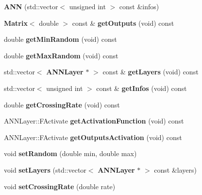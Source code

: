\begin{DoxyCompactItemize}
\item 
{\bfseries A\+N\+N} (std\+::vector$<$ unsigned int $>$ const \&infos)\label{class_g_a_n_n_1_1_a_n_n_a8b7b98feba4aea412db698035cdcb418}

\item 
{\bf Matrix}$<$ double $>$ const \& {\bfseries get\+Outputs} (void) const \label{class_g_a_n_n_1_1_a_n_n_a0c24550b535019fc04027da71f3e8ebf}

\item 
double {\bfseries get\+Min\+Random} (void) const \label{class_g_a_n_n_1_1_a_n_n_a732ada0242d9ac9a9a52c7f0c09ca26a}

\item 
double {\bfseries get\+Max\+Random} (void) const \label{class_g_a_n_n_1_1_a_n_n_a3baaedfda1392d8eea5c9a814567626d}

\item 
std\+::vector$<$ {\bf A\+N\+N\+Layer} $\ast$ $>$ const \& {\bfseries get\+Layers} (void) const \label{class_g_a_n_n_1_1_a_n_n_a7583e743d7a6d11a36d2b6541b125654}

\item 
std\+::vector$<$ unsigned int $>$ const \& {\bfseries get\+Infos} (void) const \label{class_g_a_n_n_1_1_a_n_n_a7524d58a84e19f6dace9fd35a2faf224}

\item 
double {\bfseries get\+Crossing\+Rate} (void) const \label{class_g_a_n_n_1_1_a_n_n_a0f0cfbbfd49b831516075cd6360366ad}

\item 
A\+N\+N\+Layer\+::\+F\+Activate {\bfseries get\+Activation\+Function} (void) const \label{class_g_a_n_n_1_1_a_n_n_ab94e7f60a43f5bef2314529075a95487}

\item 
A\+N\+N\+Layer\+::\+F\+Activate {\bfseries get\+Outputs\+Activation} (void) const \label{class_g_a_n_n_1_1_a_n_n_a26b4cbdcbe8bd55986963b26c2e152ee}

\item 
void {\bfseries set\+Random} (double min, double max)\label{class_g_a_n_n_1_1_a_n_n_adcedd9edf79df8a07a25d11cdefb5310}

\item 
void {\bfseries set\+Layers} (std\+::vector$<$ {\bf A\+N\+N\+Layer} $\ast$ $>$ const \&layers)\label{class_g_a_n_n_1_1_a_n_n_aae6cc0117e368dec728e5164fd4877cc}

\item 
void {\bfseries set\+Crossing\+Rate} (double rate)\label{class_g_a_n_n_1_1_a_n_n_a4476dd0e4d95747cae5489db42639190}


\end{DoxyCompactItemize}

